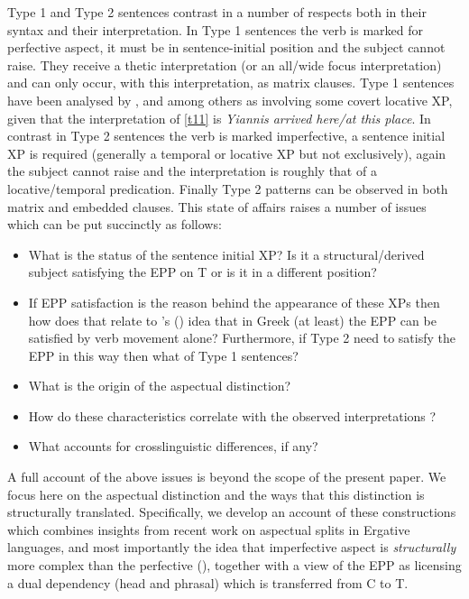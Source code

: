 \documentclass[11pt]{article}
\newcommand{\citeposs}[1]{\citeauthor{#1}'s (\citeyear{#1})}
\newcommand{\typa}{{Type 1}\xspace}
\newcommand{\typb}{{Type 2}\xspace}
\begin{document}
\typa and \typb sentences contrast in a number of respects both in their syntax and their interpretation.  In \typa sentences the verb is marked for perfective aspect, it must be in sentence-initial position and the subject cannot raise.  They receive a thetic interpretation (or an all/wide focus interpretation) and can only occur, with this interpretation, as matrix clauses.  \typa sentences have been analysed by \citet{pinto:97}, \citet{alexiadou:11b} and \citet{sheehan:06} among others as involving some covert locative XP, given that the interpretation of \ref{t11} is \textit{ Yiannis arrived here/at this place}. In contrast in  \typb sentences the verb is marked imperfective, a sentence initial XP is required (generally a temporal or locative XP but not exclusively), again the subject cannot raise and the interpretation is roughly that of a locative/temporal predication.  Finally \typb patterns can be observed in both matrix and embedded clauses. This state of affairs raises a number of issues which can be put succinctly as follows:
\begin{itemize}
\item What is the status of the sentence initial XP?  Is it a structural/derived subject satisfying the EPP on T or is it in a different position?
\item If EPP satisfaction is the reason behind the appearance of these XPs then how does that relate to \citeposs{alexiadou-anagnostopoulou:98} idea that in Greek (at least) the EPP can be satisfied by verb movement alone?  Furthermore, if \typb need to satisfy the EPP in this way then what of \typa sentences?
\item What is the origin of the aspectual distinction?
\item How do these characteristics correlate with the observed interpretations ? 
\item What accounts for crosslinguistic differences, if any?
\end{itemize}

A full account of the above issues is beyond the scope of the present paper.  We focus here on the aspectual distinction and the ways that this distinction is structurally translated.
Specifically, we develop an account of these constructions which combines insights from recent work on aspectual splits in Ergative languages, and most importantly the idea that imperfective aspect is \textit{structurally} more complex than the perfective (\citet{kalin-vanurk:12}), together with a view of the EPP as licensing a dual dependency (head and phrasal) which is transferred from C to T.
\end{document}
